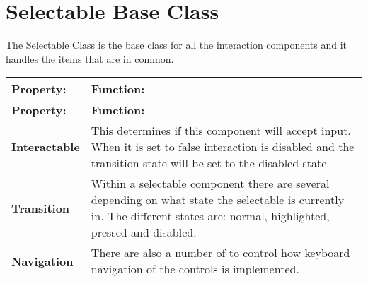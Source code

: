 \chapter{Selectable Base Class}
\hypertarget{md__hey_tea_9_2_library_2_package_cache_2com_8unity_8ugui_0d1_80_80_2_documentation_0i_2script-_selectable}{}\label{md__hey_tea_9_2_library_2_package_cache_2com_8unity_8ugui_0d1_80_80_2_documentation_0i_2script-_selectable}
\label{md__hey_tea_9_2_library_2_package_cache_2com_8unity_8ugui_0d1_80_80_2_documentation_0i_2script-_selectable_autotoc_md4919}%
%
 The Selectable Class is the base class for all the interaction components and it handles the items that are in common.

\tabulinesep=1mm
\begin{longtabu}spread 0pt [c]{*{2}{|X[-1]}|}
\hline
\cellcolor{\tableheadbgcolor}\textbf{ {\bfseries{Property\+:}}   }&\cellcolor{\tableheadbgcolor}\textbf{ {\bfseries{Function\+:}}    }\\
\endfirsthead
\hline
\endfoot
\hline
\cellcolor{\tableheadbgcolor}\textbf{ {\bfseries{Property\+:}}   }&\cellcolor{\tableheadbgcolor}\textbf{ {\bfseries{Function\+:}}    }\\
\endhead
{\bfseries{Interactable}}   &This determines if this component will accept input. When it is set to false interaction is disabled and the transition state will be set to the disabled state.    \\
{\bfseries{Transition}}   &Within a selectable component there are several  depending on what state the selectable is currently in. The different states are\+: normal, highlighted, pressed and disabled.    \\
{\bfseries{Navigation}}   &There are also a number of  to control how keyboard navigation of the controls is implemented.   \\
\end{longtabu}
